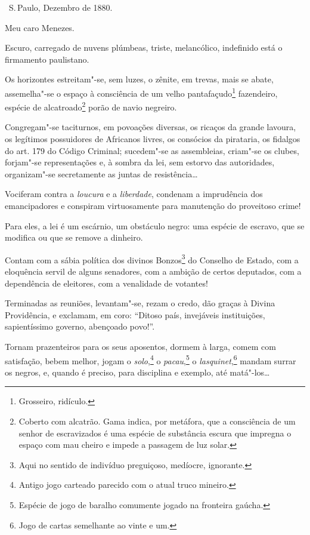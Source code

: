 \hfill\ S.\,Paulo, Dezembro de 1880.\bigskip

\noindent{}Meu caro Menezes.\smallskip

Escuro, carregado de nuvens plúmbeas, triste, melancólico, indefinido
está o firmamento paulistano.

Os horizontes estreitam"-se, sem luzes, o zênite, em trevas, mais se
abate, assemelha"-se o espaço à consciência de um velho
pantafaçudo\footnote{Grosseiro, ridículo.} fazendeiro, espécie de
alcatroado\footnote{Coberto com alcatrão. Gama indica, por metáfora,
  que a consciência de um senhor de escravizados é uma espécie de
  substância escura que impregna o espaço com mau cheiro e impede a
  passagem de luz solar.} porão de navio negreiro.

Congregam"-se taciturnos, em povoações diversas, os ricaços da grande
lavoura, os legítimos possuidores de Africanos livres, os consócios da
pirataria, os fidalgos do art. 179 do Código Criminal; sucedem"-se as
assembleias, criam"-se os clubes, forjam"-se representações e, à sombra da
lei, sem estorvo das autoridades, organizam"-se secretamente as juntas de
resistência\ldots{}

Vociferam contra a \emph{loucura} e a \emph{liberdade}, condenam a
imprudência dos emancipadores e conspiram virtuosamente para manutenção
do proveitoso crime!

Para eles, a lei é um escárnio, um obstáculo negro: uma espécie de
escravo, que se modifica ou que se remove a dinheiro.

Contam com a sábia política dos divinos Bonzos\footnote{Aqui no
  sentido de indivíduo preguiçoso, medíocre, ignorante.} do Conselho de
Estado, com a eloquência servil de alguns senadores, com a ambição de
certos deputados, com a dependência de eleitores, com a venalidade de
votantes!

Terminadas as reuniões, levantam"-se, rezam o credo, dão graças à Divina
Providência, e exclamam, em coro: ``Ditoso país, invejáveis instituições,
sapientíssimo governo, abençoado povo!''.

Tornam prazenteiros para os seus aposentos, dormem à larga, comem com
satisfação, bebem melhor, jogam o \emph{solo},\footnote{Antigo jogo
  carteado parecido com o atual truco mineiro.} o
\emph{pacau},\footnote{Espécie de jogo de baralho comumente jogado na
  fronteira gaúcha.} o \emph{lasquinet},\footnote{Jogo de cartas
  semelhante ao vinte e um.} mandam surrar os negros, e,
quando é preciso, para disciplina e exemplo, até matá"-los\ldots{}

